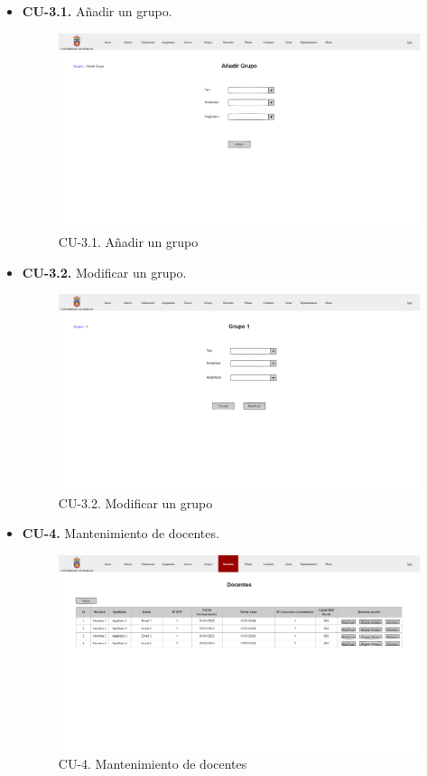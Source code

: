 \begin{itemize}
	\item \textbf{CU-3.1.} Añadir un grupo.
	\begin{figure}[!h]
		\centering
		\includegraphics[width=\textwidth]{../img/Anexos/Vistas/add_grupo.png}
		\caption{CU-3.1. Añadir un grupo}\label{fig:../img/Anexos/Vistas/add_grupo.png}
	\end{figure}
	
	\item \textbf{CU-3.2.} Modificar un grupo.
	\begin{figure}[!h]
		\centering
		\includegraphics[width=\textwidth]{../img/Anexos/Vistas/mod_grupo.png}
		\caption{CU-3.2. Modificar un grupo}\label{fig:../img/Anexos/Vistas/mod_grupo.png}
	\end{figure}
	
	\item \textbf{CU-4.} Mantenimiento de docentes.
	\begin{figure}[!h]
		\centering
		\includegraphics[width=\textwidth]{../img/Anexos/Vistas/docentes.png}
		\caption{CU-4. Mantenimiento de docentes}\label{fig:../img/Anexos/Vistas/docentes.png}
	\end{figure}
	

\end{itemize}
